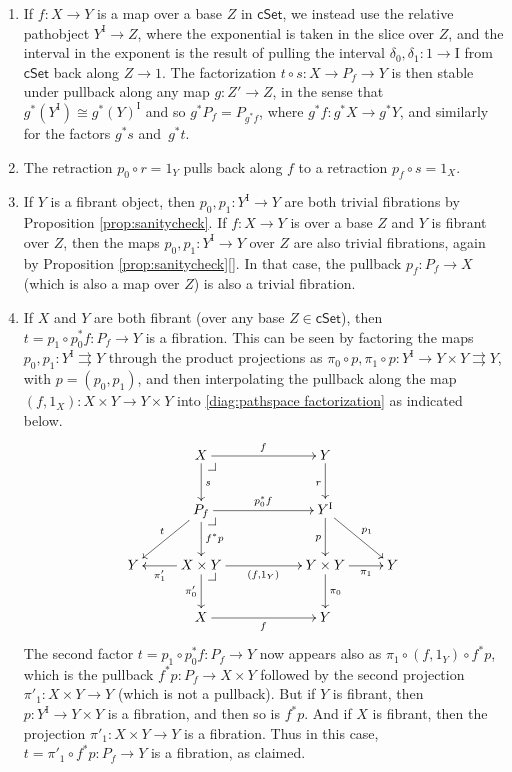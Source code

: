 \documentclass[12pt]{article}
\makeatletter
\newcommand{\ednote}[1]{[\textit{\color{red}{#1}}]} %
\newcommand{\cSet}{\ensuremath{\mathsf{cSet}}}
\newcommand{\ra}{\ensuremath{\rightarrow}}
\renewcommand{\to}{\ensuremath{\rightarrow}}
\newcommand{\I}{\ensuremath{\mathrm{I}}}
\theoremstyle{remark}
\theoremstyle{definition}
\newcommand{\pbcorner}[1][dr]{\save*!/#1-1.2pc/#1:(-1,1)@^{|-}\restore}
\makeatother
\begin{document}
\begin{enumerate}
\item If $f:X\ra Y$ is a map over a base $Z$ in $\cSet$, we instead use the relative pathobject $Y^\I \to Z$, where the exponential is taken in the slice over $Z$, and the interval in the exponent is the result of pulling the interval $\delta_0, \delta_1 : 1\ra\I$ from $\cSet$ back along $Z\to 1$. The factorization $t\circ s:X\ra P_f \ra Y$ is then stable under pullback along any map $g : Z' \ra Z$, in the sense that $g^*(Y^\I) \cong g^*(Y)^\I$ and so $g^*P_f = P_{g^*f}$, where $g^*f : g^*X \ra g^* Y$, and similarly for the factors $g^*s$ and~$g^*t$.  

\item The retraction $p_0\circ r = 1_Y$ pulls back along $f$ to a retraction $p_f \circ s =1_X$.

\item If $Y$ is a fibrant object, then $p_0 , p_1 : Y^\I \ra Y$ are both trivial fibrations by Proposition \ref{prop:sanitycheck}.  If $f:X\ra Y$ is over a base $Z$ and $Y$ is fibrant over $Z$, then the maps $p_0 , p_1 : Y^\I \ra Y$ over $Z$ are also trivial fibrations, again by Proposition \ref{prop:sanitycheck}\ednote{add a proof}.  In that case, the pullback $p_f : P_f \ra X$ (which is also a map over $Z$) is also a trivial fibration. 

\item If $X$ and $Y$ are both fibrant (over any base $Z\in \cSet$), then $t= p_1\circ p_0^*f : P_f \ra Y$ is a fibration.  This can be seen by factoring the maps $p_0, p_1 :Y^\I \rightrightarrows  Y$ through the product projections as $\pi_0\circ p, \pi_1\circ p : Y^\I \ra Y\times Y \rightrightarrows Y$, with $p = (p_0, p_1)$, and then interpolating the pullback along the map $(f,1_X) : X\times Y\ra Y\times Y$ into \eqref{diag:pathspace factorization} as indicated below.
\begin{equation}\label{diag:pathspace factorization2}
\xymatrix{
& X \ar[d]^s \ar[rr]^f \pbcorner && Y \ar[d]_r \\
& \ar[ld]_t P_f  \ar[d]^{f^*p} \ar[rr]^{p_0^*f} \pbcorner && Y^\I \ar[d]_{p} \ar[rd]^{p_1}\\
Y & \ar[l]^-{\pi'_1} X\times Y\ar[d]_-{\pi'_0} \ar[rr]_{(f,1_Y)} \pbcorner  &&  Y\times Y \ar[d]^{\pi_0} \ar[r]_-{\pi_1} & Y \\
& X \ar[rr]_f  &&  Y &
}
\end{equation}
The second factor $t = p_1\circ p_0^*f : P_f \ra Y$ now appears also as $\pi_1\circ(f,1_Y)\circ f^*p$, which is the pullback $f^*p: P_f \ra X\times Y$ followed by the second projection $\pi'_1 : X\times Y \ra Y$ (which is not a pullback). But if $Y$ is fibrant, then $p : Y^\I \ra Y\times Y$ is a fibration, and then so is $f^*p$. And if $X$ is fibrant, then the projection $\pi'_1:X\times Y \ra Y$ is a fibration. Thus in this case, $t = \pi'_1\circ f^*p : P_f \ra Y$ is a fibration, as claimed.


\end{enumerate}
\end{document}

